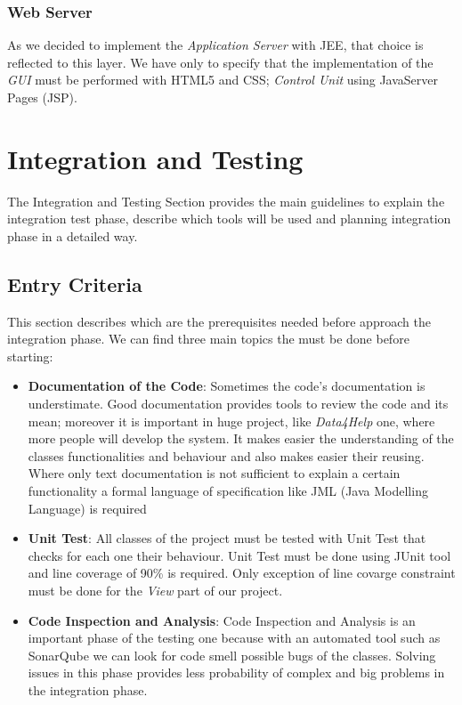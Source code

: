 \subsubsection{Web Server}
As we decided to implement the \textit{Application Server} with JEE, that choice is reflected to this layer. We have only to specify that the implementation of the \textit{GUI} must be performed with HTML5 and CSS; \textit{Control Unit} using JavaServer Pages (JSP).


\section{Integration and Testing}\label{int_test}
The Integration and Testing Section provides the main guidelines to explain the integration test phase, describe which tools will be used and planning integration phase in a detailed way.

\subsection{Entry Criteria}
This section describes which are the prerequisites needed before approach the integration phase. We can find three main topics the must be done before starting:
\begin{itemize}
  \item \textbf{Documentation of the Code}: Sometimes the code's documentation is understimate. Good documentation provides tools to review the code and its mean; moreover it is important in huge project, like \textit{Data4Help} one, where more people will develop the system. It makes easier the understanding of the classes functionalities and behaviour and also makes easier their reusing.\\
  Where only text documentation is not sufficient to explain a certain functionality a formal language of specification like JML (Java Modelling Language) is required
  \item \textbf{Unit Test}: All classes of the project must be tested with Unit Test that checks for each one their behaviour. Unit Test must be done using JUnit tool and line coverage of 90\% is required. Only exception of line covarge constraint must be done for the \textit{View} part of our project.
  \item \textbf{Code Inspection and Analysis}: Code Inspection and Analysis is an important phase of the testing one because with an automated tool such as SonarQube we can look for code smell possible bugs of the classes. Solving issues in this phase provides less probability of complex and big problems in the integration phase.
\end{itemize}
